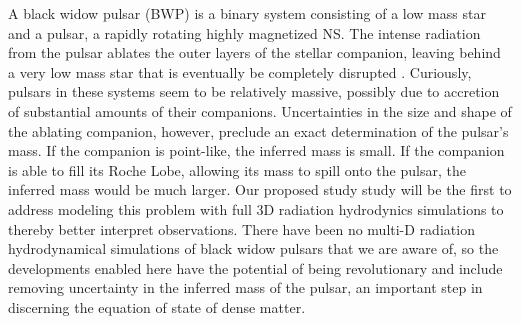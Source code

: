 A black widow pulsar (BWP) is a binary system consisting of a low mass
star and a pulsar, a rapidly rotating highly magnetized NS.  The
intense radiation from the pulsar ablates the outer layers of the
stellar companion, leaving behind a very low mass star that is
eventually be completely disrupted \cite{bednareksitarek2013}. Curiously,
pulsars in these systems seem
to be relatively massive, possibly due to accretion of substantial
amounts of their companions.  Uncertainties in the size and shape of
the ablating companion, however, preclude an exact determination of
the pulsar's mass. If the companion is point-like, the inferred mass
is small.  If the companion is able to fill its Roche Lobe, allowing
its mass to spill onto the pulsar, the inferred mass would be much
larger. Our proposed study study will be the first to address modeling
this problem with full 3D radiation hydrodynics simulations to thereby
better interpret observations. There have been no multi-D radiation
hydrodynamical simulations of black widow pulsars that we are aware
of, so the developments enabled here have the potential of being
revolutionary and include removing uncertainty in the inferred mass of
the pulsar, an important step in discerning the equation of state of
dense matter.


